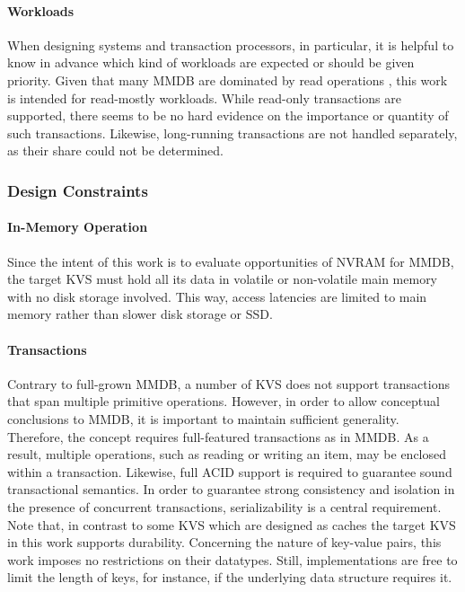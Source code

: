 \paragraph{Workloads}

When designing systems and transaction processors, in particular, it is helpful
to know in advance which kind of workloads are expected or should be given
priority. Given that many \ac{MMDB} are dominated by read operations
\cite{andrei2017sap}, this work is intended for read-mostly workloads. While
read-only transactions are supported, there seems to be no hard evidence on the
importance or quantity of such transactions. Likewise, long-running transactions
are not handled separately, as their share could not be determined.

\subsubsection{Design Constraints}

\paragraph{In-Memory Operation}

Since the intent of this work is to evaluate opportunities of \ac{NVRAM} for
\ac{MMDB}, the target \ac{KVS} must hold all its data in volatile or
non-volatile main memory with no disk storage involved. This way, access
latencies are limited to main memory rather than slower disk storage or
\ac{SSD}.

\paragraph{Transactions}

Contrary to full-grown \ac{MMDB}, a number of \ac{KVS} does not support
transactions that span multiple primitive operations. However, in order to allow
conceptual conclusions to \ac{MMDB}, it is important to maintain sufficient
generality. Therefore, the concept requires full-featured transactions as in
\ac{MMDB}. As a result, multiple operations, such as reading or writing an item,
may be enclosed within a transaction. Likewise, full ACID support is required to
guarantee sound transactional semantics. In order to guarantee strong
consistency and isolation in the presence of concurrent transactions,
serializability is a central requirement. Note that, in contrast to some
\ac{KVS} which are designed as caches the target \ac{KVS} in this work supports
durability. Concerning the nature of key-value pairs, this work imposes no
restrictions on their datatypes. Still, implementations are free to limit the
length of keys, for instance, if the underlying data structure requires it.

